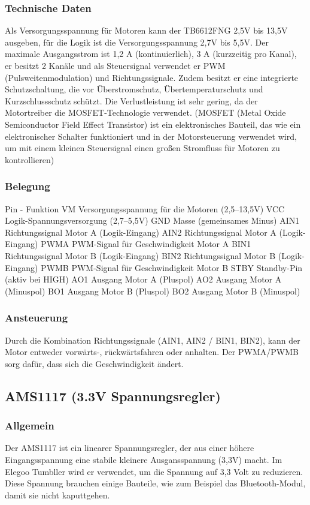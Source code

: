 \subsubsection{Technische Daten}
Als Versorgungsspannung für Motoren kann der TB6612FNG 2,5V bis 13,5V ausgeben, für die Logik ist die Versorgungsspannung 2,7V bis 5,5V. 
Der maximale Ausgangsstrom ist 1,2 A (kontinuierlich), 3 A (kurzzeitig pro Kanal), er besitzt 2 Kanäle und als Steuersignal verwendet er PWM (Pulsweitenmodulation) und Richtungssignale. 
Zudem besitzt er eine integrierte Schutzschaltung, die vor Überstromschutz, Übertemperaturschutz und Kurzschlussschutz schützt. 
Die Verlustleistung ist sehr gering, da der Motortreiber die MOSFET-Technologie verwendet. (MOSFET (Metal Oxide Semiconductor Field Effect Transistor) ist ein elektronisches Bauteil, 
das wie ein elektronischer Schalter funktioniert und in der Motorsteuerung verwendet wird, um mit einem kleinen Steuersignal einen großen Stromfluss für Motoren zu kontrollieren)
\subsubsection{Belegung}
Pin	-	Funktion
VM	Versorgungsspannung für die Motoren (2,5–13,5V)
VCC	Logik-Spannungsversorgung (2,7–5,5V)
GND	Masse (gemeinsames Minus)
AIN1	Richtungssignal Motor A (Logik-Eingang)
AIN2	Richtungssignal Motor A (Logik-Eingang)
PWMA	PWM-Signal für Geschwindigkeit Motor A
BIN1	Richtungssignal Motor B (Logik-Eingang)
BIN2	Richtungssignal Motor B (Logik-Eingang)
PWMB	PWM-Signal für Geschwindigkeit Motor B
STBY	Standby-Pin (aktiv bei HIGH)
AO1	Ausgang Motor A (Pluspol)
AO2	Ausgang Motor A (Minuspol)
BO1	Ausgang Motor B (Pluspol)
BO2	Ausgang Motor B (Minuspol)

\subsubsection{Ansteuerung}
Durch die Kombination Richtungssignale (AIN1, AIN2 / BIN1, BIN2), kann der Motor entweder vorwärts-, rückwärtsfahren oder anhalten.
Der PWMA/PWMB sorg dafür, dass sich die Geschwindigkeit ändert.
%
\subsection{AMS1117 (3.3V Spannungsregler)}
%
\subsubsection{Allgemein}
Der AMS1117 ist ein linearer Spannungsregler, der aus einer höhere Eingangsspannung eine stabile kleinere Ausgansspannung (3,3V) macht. 
Im Elegoo Tumbller wird er verwendet, um die Spannung auf 3,3 Volt zu reduzieren. Diese Spannung brauchen einige Bauteile, wie zum Beispiel das Bluetooth-Modul, damit sie nicht kaputtgehen.
